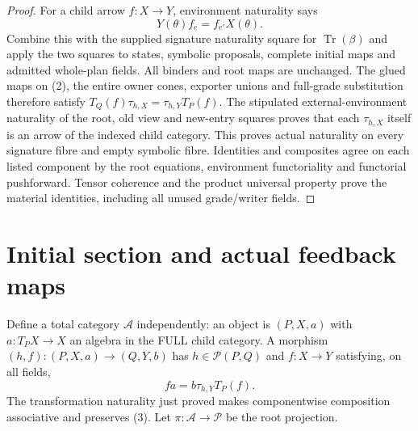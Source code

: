 \documentclass[11pt]{article}
\begin{document}
\begin{proof}
For a child arrow $f:X\to Y$, environment naturality says
\[
 Y(\theta)f_e=f_{e'}X(\theta).
\]
Combine this with the supplied signature naturality square for $\operatorname{Tr}(\beta)$ and apply the two squares to states, symbolic proposals, complete initial maps and admitted whole-plan fields. All binders and root maps are unchanged. The glued maps on (2), the entire owner cones, exporter unions and full-grade substitution therefore satisfy
$T_Q(f)\tau_{h,X}=\tau_{h,Y}T_P(f)$.
The stipulated external-environment naturality of the root, old view and new-entry squares proves that each $\tau_{h,X}$ itself is an arrow of the indexed child category. This proves actual naturality on every signature fibre and empty symbolic fibre. Identities and composites agree on each listed component by the root equations, environment functoriality and functorial pushforward. Tensor coherence and the product universal property prove the material identities, including all unused grade/writer fields.
\end{proof}

\section{Initial section and actual feedback maps}
Define a total category $\mathcal A$ independently: an object is $(P,X,a)$ with $a:T_PX\to X$ an algebra in the FULL child category. A morphism $(h,f):(P,X,a)\to(Q,Y,b)$ has $h\in\mathcal P(P,Q)$ and $f:X\to Y$ satisfying, on all fields,
\[
                   f a=b\tau_{h,Y}T_P(f).                \tag{3}
\]
The transformation naturality just proved makes componentwise composition associative and preserves (3). Let $\pi:\mathcal A\to\mathcal P$ be the root projection.
\end{document}
